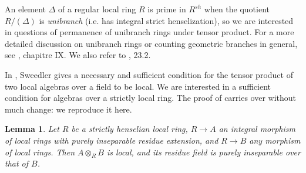 \documentclass[a4paper,12pt]{amsart} %
\numberwithin{equation}{subsection}
\theoremstyle{definition}
\theoremstyle{plain}%
\newtheorem{lemma}[definition]{Lemma}
\theoremstyle{remark}
\begin{document}
An element $\Delta$ of a regular local ring $R$ is prime in $R^{sh}$ when the quotient $R/(\Delta)$ is \emph{unibranch} (i.e. has integral strict henselization), so we are interested in questions of permanence of unibranch rings under tensor product. For a more detailed discussion on unibranch rings or counting geometric branches in general, see \cite{Raynaud}, chapitre IX. We also refer to \cite{EGA4.1}, 23.2.

In \cite{Tensor_local}, Sweedler gives a necessary and sufficient condition for the tensor product of two local algebras over a field to be local. We are interested in a sufficient condition for algebras over a strictly local ring. The proof of \cite{Tensor_local} carries over without much change: we reproduce it here.

\begin{lemma}\label{lemme le produit tensoriel reste local}
Let $R$ be a strictly henselian local ring, $R\to A$ an integral morphism of local rings with purely inseparable residue extension, and $R\to B$ any morphism of local rings. Then $A\otimes_R B$ is local, and its residue field is purely inseparable over that of $B$.
\end{lemma}
\end{document}
